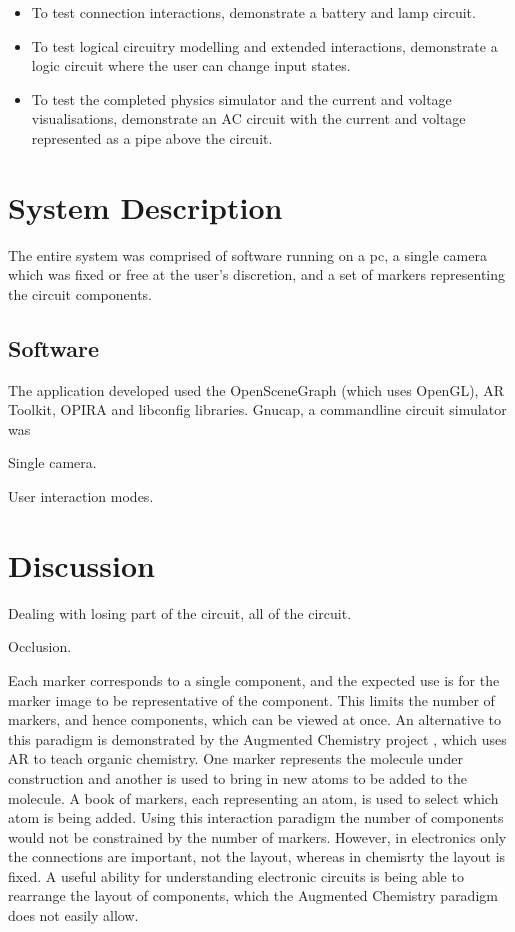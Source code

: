 \begin{itemize}
\item To test connection interactions, demonstrate a battery and lamp circuit.
\item To test logical circuitry modelling and extended interactions, demonstrate a logic circuit where the user can change input states.
\item To test the completed physics simulator and the current and voltage visualisations, demonstrate an AC circuit with the current and voltage represented as a pipe above the circuit.
\end{itemize}

\section{System Description}
The entire system was comprised of software running on a pc, a single camera which was fixed or free at the user's discretion, and a set of markers representing the circuit components.

\subsection{Software}
The application developed used the OpenSceneGraph (which uses OpenGL), AR Toolkit, OPIRA and libconfig libraries. Gnucap, a commandline circuit simulator was 

Single camera.

User interaction modes.

\section{Discussion}

Dealing with losing part of the circuit, all of the circuit.

Occlusion.

Each marker corresponds to a single component, and the expected use is for the marker image to be representative of the component. This limits the number of markers, and hence components, which can be viewed at once. An alternative to this paradigm is demonstrated by the Augmented Chemistry project \cite{fjeld07}, which uses AR to teach organic chemistry. One marker represents the molecule under construction and another is used to bring in new atoms to be added to the molecule. A book of markers, each representing an atom, is used to select which atom is being added. Using this interaction paradigm the number of components would not be constrained by the number of markers. However, in electronics only the connections are important, not the layout, whereas in chemisrty the layout is fixed. A useful ability for understanding electronic circuits is being able to rearrange the layout of components, which the Augmented Chemistry paradigm does not easily allow.


